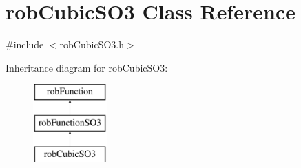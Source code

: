 \hypertarget{classrob_cubic_s_o3}{\section{rob\-Cubic\-S\-O3 Class Reference}
\label{classrob_cubic_s_o3}
}


{\ttfamily \#include $<$rob\-Cubic\-S\-O3.\-h$>$}

Inheritance diagram for rob\-Cubic\-S\-O3\-:\begin{figure}[H]
\begin{center}
\leavevmode
\includegraphics[height=3.000000cm]{d4/dc8/classrob_cubic_s_o3}
\end{center}
\end{figure}
